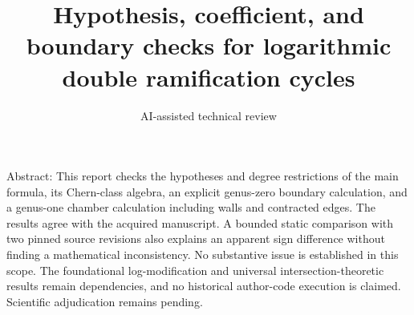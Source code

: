 \documentclass[10pt]{article}
\title{Hypothesis, coefficient, and boundary checks for logarithmic double ramification cycles}
\author{AI-assisted technical review}
\date{}
\begin{document}
\maketitle
Abstract: This report checks the hypotheses and degree restrictions of the main formula, its Chern-class algebra, an explicit genus-zero boundary calculation, and a genus-one chamber calculation including walls and contracted edges. The results agree with the acquired manuscript. A bounded static comparison with two pinned source revisions also explains an apparent sign difference without finding a mathematical inconsistency. No substantive issue is established in this scope. The foundational log-modification and universal intersection-theoretic results remain dependencies, and no historical author-code execution is claimed. Scientific adjudication remains pending.\par
\end{document}
